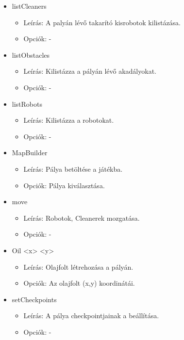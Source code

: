 \begin{itemize}
\item listCleaners
	\begin{itemize}
	\item Leírás: A palyán lévő takarító kisrobotok kilistázása.
	\item Opciók: -
	\end{itemize}
	
\item listObstacles
	\begin{itemize}
	\item Leírás: Kilistázza a pályán lévő akadályokat.
	\item Opciók: -
	\end{itemize}
	
\item listRobots
	\begin{itemize}
	\item Leírás: Kilistázza a robotokat.
	\item Opciók: -
	\end{itemize}
	
\item MapBuilder 
	\begin{itemize}
	\item Leírás: Pálya betöltése a játékba.
	\item Opciók: Pálya kiválasztása.
	\end{itemize}
	
\item move
	\begin{itemize}
	\item Leírás: Robotok, Cleanerek mozgatása.
	\item Opciók: -
	\end{itemize}
	
\item Oil <x> <y>
	\begin{itemize}
	\item Leírás: Olajfolt létrehozása a pályán.
	\item Opciók: Az olajfolt (x,y) koordinátái.
	\end{itemize}
	
\item setCheckpoints
	\begin{itemize}
	\item Leírás: A pálya checkpointjainak a beállítása.
	\item Opciók: -
	\end{itemize}

\end{itemize}

